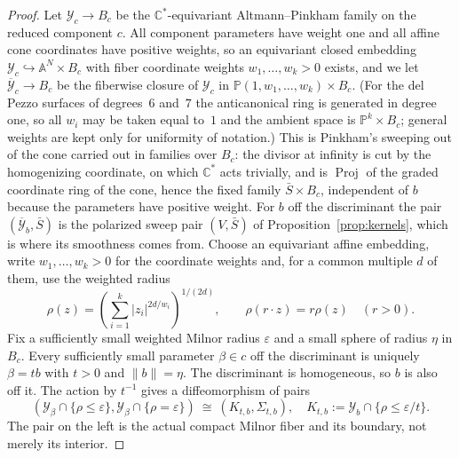 \documentclass[11pt]{amsart}
\theoremstyle{definition}
\theoremstyle{remark}
\theoremstyle{plain}
\newcommand{\CC}{\mathbb{C}}
\newcommand{\PP}{\mathbb{P}}
\newcommand{\Proj}{\operatorname{Proj}}
\newcommand{\AAf}{\mathbb{A}}
\newcommand{\Sb}{\bar{S}}
\begin{document}
\begin{proof}
Let $\mathcal Y_c\to B_c$ be the $\CC^*$-equivariant
Altmann--Pinkham family on the reduced component $c$.  All component
parameters have weight one and all affine cone coordinates have positive
weights, so an equivariant closed embedding
$\mathcal Y_c\hookrightarrow\AAf^N\times B_c$ with fiber coordinate weights
$w_1,\dots,w_k>0$ exists, and we let $\overline{\mathcal Y}_c\to B_c$ be the
fiberwise closure of $\mathcal Y_c$ in
$\PP(1,w_1,\dots,w_k)\times B_c$.  (For the del Pezzo surfaces of degrees~$6$
and~$7$ the anticanonical ring is generated in degree one, so all $w_i$ may be
taken equal to~$1$ and the ambient space is $\PP^k\times B_c$; general weights
are kept only for uniformity of notation.)  This is Pinkham's sweeping out of
the cone \cite[(4.2),\,(5.1)]{Pinkham74} carried out in families over $B_c$:
the divisor at infinity is cut by the homogenizing coordinate, on which
$\CC^*$ acts trivially, and is
$\Proj$ of the graded coordinate ring of the cone, hence the fixed family
$\Sb\times B_c$, independent of $b$ because the parameters have positive
weight.  For $b$ off the discriminant the pair
$(\overline{\mathcal Y}_b,\Sb)$ is the polarized sweep pair $(V,\Sb)$ of
Proposition~\ref{prop:kernels}, which is where its smoothness comes from.  Choose an equivariant affine embedding,
write $w_1,\dots,w_k>0$ for the coordinate weights and, for a common
multiple $d$ of them, use the weighted radius
\[
 \rho(z)=\left(\sum_{i=1}^k|z_i|^{2d/w_i}\right)^{1/(2d)},
 \qquad \rho(r\cdot z)=r\rho(z)\quad(r>0).
\]
Fix a sufficiently small weighted Milnor radius $\varepsilon$ and a
small sphere of radius $\eta$ in $B_c$.  Every sufficiently small
parameter $\beta\in c$ off the discriminant is uniquely
$\beta=t b$ with $t>0$ and $\lVert b\rVert=\eta$.  The discriminant is
homogeneous, so $b$ is also off it.  The action by $t^{-1}$ gives a
diffeomorphism of pairs
\begin{equation}\label{eq:compactcore}
 \left(\mathcal Y_\beta\cap\{\rho\leq\varepsilon\},
       \mathcal Y_\beta\cap\{\rho=\varepsilon\}\right)
 \ \cong\
 \left(K_{t,b},\Sigma_{t,b}\right),
 \quad
 K_{t,b}:=\mathcal Y_b\cap\{\rho\leq\varepsilon/t\}.
\end{equation}
The pair on the left is the actual compact Milnor fiber and its
boundary, not merely its interior.


\end{proof}
\end{document}
